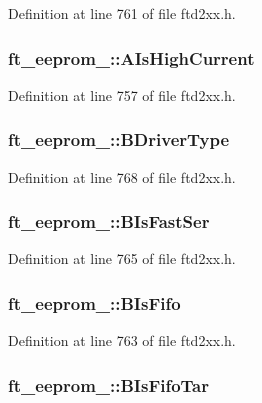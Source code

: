 Definition at line 761 of file ftd2xx.h.\hypertarget{structft__eeprom__2232_a66f55cd8947dc7015515038a35495ddc}{
\subsubsection[{AIsHighCurrent}]{ {\bf ft\_\-eeprom\_::AIsHighCurrent}}}
\label{structft__eeprom__2232_a66f55cd8947dc7015515038a35495ddc}


Definition at line 757 of file ftd2xx.h.\hypertarget{structft__eeprom__2232_a74407077c9097bf480f560b0511daf79}{
\subsubsection[{BDriverType}]{ {\bf ft\_\-eeprom\_::BDriverType}}}
\label{structft__eeprom__2232_a74407077c9097bf480f560b0511daf79}


Definition at line 768 of file ftd2xx.h.\hypertarget{structft__eeprom__2232_a33a65a0fbacf825f9af5903b834b9ab2}{
\subsubsection[{BIsFastSer}]{ {\bf ft\_\-eeprom\_::BIsFastSer}}}
\label{structft__eeprom__2232_a33a65a0fbacf825f9af5903b834b9ab2}


Definition at line 765 of file ftd2xx.h.\hypertarget{structft__eeprom__2232_a090431f3dee969f1fd88cf30aabffe2f}{
\subsubsection[{BIsFifo}]{ {\bf ft\_\-eeprom\_::BIsFifo}}}
\label{structft__eeprom__2232_a090431f3dee969f1fd88cf30aabffe2f}


Definition at line 763 of file ftd2xx.h.\hypertarget{structft__eeprom__2232_a576a9319f978ff28d3bb0a042d6196a8}{
\subsubsection[{BIsFifoTar}]{ {\bf ft\_\-eeprom\_::BIsFifoTar}}}
\label{structft__eeprom__2232_a576a9319f978ff28d3bb0a042d6196a8}



